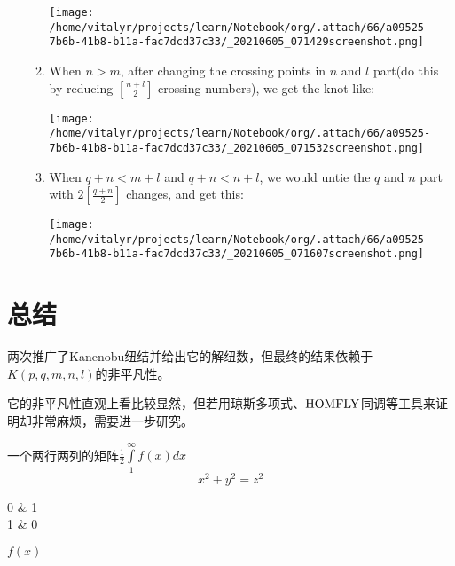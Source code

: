 \documentclass[bigger]{beamer}
\begin{document}
\begin{enumerate}
\begin{enumerate}
\begin{center}
\texttt{[image: /home/vitalyr/projects/learn/Notebook/org/.attach/66/a09525-7b6b-41b8-b11a-fac7dcd37c33/\_20210605\_071429screenshot.png]}
\end{center}
\item When \(n>m\), after changing the crossing points in \(n\) and \(l\) part(do this by reducing \([\frac{n+l}{2}]\) crossing numbers), we get the knot like:
\label{sec:org6df26ef}
\begin{center}
\texttt{[image: /home/vitalyr/projects/learn/Notebook/org/.attach/66/a09525-7b6b-41b8-b11a-fac7dcd37c33/\_20210605\_071532screenshot.png]}
\end{center}
\item When \(q + n < m + l\) and \(q + n < n + l\), we would untie the \(q\) and \(n\) part with \(2[\frac{q+n}{2}]\) changes, and get this:
\label{sec:org05c7f0e}
\begin{center}
\texttt{[image: /home/vitalyr/projects/learn/Notebook/org/.attach/66/a09525-7b6b-41b8-b11a-fac7dcd37c33/\_20210605\_071607screenshot.png]}
\end{center}
\end{enumerate}
\end{enumerate}
\section{总结}
\label{sec:org4a25204}
两次推广了Kanenobu纽结并给出它的解纽数，但最终的结果依赖于\(K(p, q, m, n, l)\)的非平凡性。

它的非平凡性直观上看比较显然，但若用琼斯多项式、\(\rm HOMFLY\)同调等工具来证明却非常麻烦，需要进一步研究。

一个两行两列的矩阵\(\frac{1}{2} \int\limits_{1}^{\infty}f(x)dx\)
\begin{equation}
\label{eq:1}
x ^{2} + y^{2} = z^{2}
\end{equation}
\begin{table}[htbp]
\caption[]{\label{tab:2} }
\vspace{4mm}
0 & 1 \\
1 & 0
\end{table}

\(f(x)\)
\end{document}
